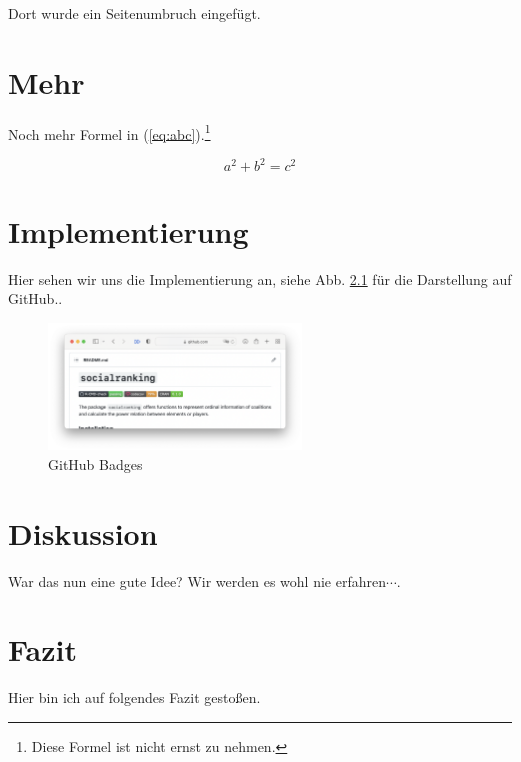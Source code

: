 \documentclass[
  12pt,
  a4paper,
  oneside]{book}
\begin{document}
Dort wurde ein Seitenumbruch eingefügt.

\hypertarget{mehr}{%
\chapter{Mehr}\label{mehr}}

Noch mehr Formel in (\ref{eq:abc}).\footnote{Diese Formel ist nicht
  ernst zu nehmen.}

\begin{equation}\label{eq:abc}
a^2 + b^2 = c^2
\end{equation}

\hypertarget{implementierung}{%
\chapter{Implementierung}\label{implementierung}}

Hier sehen wir uns die Implementierung an, siehe Abb. \ref{fig:badges}
für die Darstellung auf GitHub..

\begin{figure}
\hypertarget{fig:badges}{%
\centering
\includegraphics[width=0.6\textwidth,height=\textheight]{imgs/github_badges.png}
\caption{GitHub Badges}\label{fig:badges}
}
\end{figure}

\hypertarget{diskussion}{%
\chapter{Diskussion}\label{diskussion}}

War das nun eine gute Idee? Wir werden es wohl nie erfahren\(\cdots\).

\hypertarget{fazit}{%
\chapter{Fazit}\label{fazit}}

Hier bin ich auf folgendes Fazit gestoßen.

\backmatter

\newpage
{}

\end{document}
